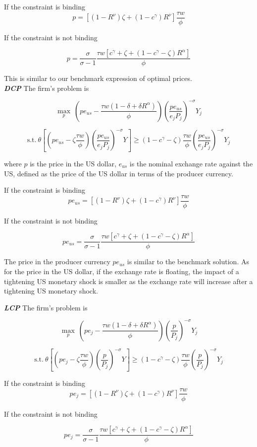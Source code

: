 If the constraint is binding
$$
p=[(1-R^{\nu})\zeta+(1-c^\gamma)R^{\nu}] \frac{\tau w}{\phi}
$$

If the constraint is not binding

$$
p=\frac{\sigma}{\sigma-1}\frac{\tau w [c^\gamma+\zeta+(1-c^\gamma-\zeta) R^\alpha]}{\phi}
$$

This is similar to our benchmark expression of optimal prices. \\

\textbf{\textit{DCP}} The firm's problem is   

$$
\max_{p} \ (pe_{us}- \frac{\tau w(1-\delta+\delta R^\alpha)}{\phi}) (\frac{pe_{us}}{e_jP_j})^{-\sigma} Y_j
$$

$$
\text{s.t.} \ \theta [(pe_{us}-\zeta \frac{\tau w}{\phi}) (\frac{pe_{us}}{e_jP_j})^{-\sigma} Y]\geq(1-c^\gamma-\zeta)\frac{\tau w}{\phi} (\frac{pe_{us}}{e_jP_j})^{-\sigma} Y_j
$$

where $p$ is the price in the US dollar, $e_{us}$ is the nominal exchange rate against the US, defined as the price of the US dollar in terms of the producer currency.

If the constraint is binding
$$
pe_{us}=[(1-R^{\nu})\zeta+(1-c^\gamma)R^{\nu}] \frac{\tau w}{\phi}
$$

If the constraint is not binding

$$
pe_{us}=\frac{\sigma}{\sigma-1}\frac{\tau w [c^\gamma+\zeta+(1-c^\gamma-\zeta) R^\alpha]}{\phi}
$$

The price in the producer currency $pe_{us}$ is similar to the benchmark solution. As for the price in the US dollar, if the exchange rate is floating, the impact of a tightening US monetary shock is smaller as the exchange rate will increase after a tightening US monetary shock.


\textbf{\textit{LCP}} The firm's problem is 

$$
\max_{p} \ (pe_j- \frac{\tau w(1-\delta+\delta R^\alpha)}{\phi}) (\frac{p}{P_j})^{-\sigma} Y_j
$$

$$
\text{s.t.} \ \theta [(pe_j-\zeta \frac{\tau w}{\phi}) (\frac{p}{P_j})^{-\sigma} Y]\geq(1-c^\gamma-\zeta)\frac{\tau w}{\phi} (\frac{p}{P_j})^{-\sigma} Y_j
$$


If the constraint is binding
$$
pe_{j}=[(1-R^{\nu})\zeta+(1-c^\gamma)R^{\nu}] \frac{\tau w}{\phi}
$$

If the constraint is not binding

$$
pe_{j}=\frac{\sigma}{\sigma-1}\frac{\tau w [c^\gamma+\zeta+(1-c^\gamma-\zeta) R^\alpha]}{\phi}
$$

